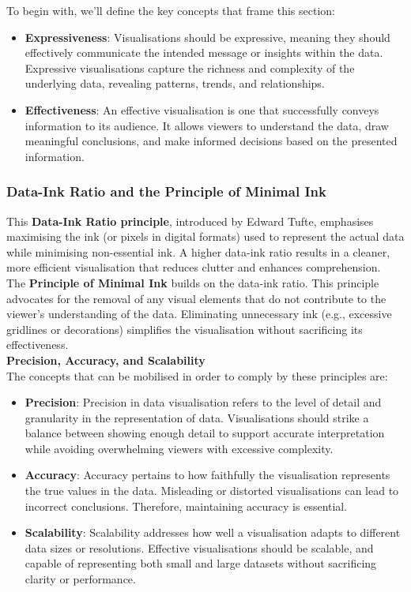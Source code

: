 \documentclass{article}\usepackage[]{graphicx}\usepackage[]{xcolor}
\begin{document}
To begin with, we'll define the key concepts that frame this section:
\begin{itemize}
    \item \textbf{Expressiveness}: Visualisations should be expressive, meaning they should effectively communicate the intended message or insights within the data. Expressive visualisations capture the richness and complexity of the underlying data, revealing patterns, trends, and relationships.
    \item \textbf{Effectiveness}: An effective visualisation is one that successfully conveys information to its audience. It allows viewers to understand the data, draw meaningful conclusions, and make informed decisions based on the presented information.
\end{itemize}

\subsubsection{Data-Ink Ratio and the Principle of Minimal Ink} 
This \textbf{Data-Ink Ratio principle}, introduced by Edward Tufte, emphasises maximising the ink (or pixels in digital formats) used to represent the actual data while minimising non-essential ink. A higher data-ink ratio results in a cleaner, more efficient visualisation that reduces clutter and enhances comprehension.\\
The \textbf{Principle of Minimal Ink} builds on the data-ink ratio. This principle advocates for the removal of any visual elements that do not contribute to the viewer's understanding of the data. Eliminating unnecessary ink (e.g., excessive gridlines or decorations) simplifies the visualisation without sacrificing its effectiveness.\\

\textbf{Precision, Accuracy, and Scalability}\\
The concepts that can be mobilised in order to comply by these principles are:
\begin{itemize}
    \item \textbf{Precision}: Precision in data visualisation refers to the level of detail and granularity in the representation of data. Visualisations should strike a balance between showing enough detail to support accurate interpretation while avoiding overwhelming viewers with excessive complexity.
    \item \textbf{Accuracy}: Accuracy pertains to how faithfully the visualisation represents the true values in the data. Misleading or distorted visualisations can lead to incorrect conclusions. Therefore, maintaining accuracy is essential.
    \item \textbf{Scalability}: Scalability addresses how well a visualisation adapts to different data sizes or resolutions. Effective visualisations should be scalable, and capable of representing both small and large datasets without sacrificing clarity or performance.
\end{itemize}
\end{document}
